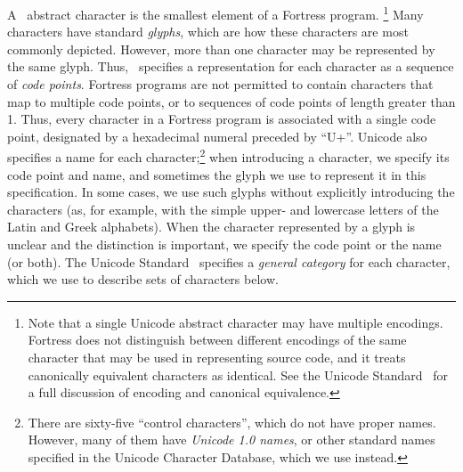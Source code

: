 A \unicode\ abstract character is the smallest element
of a Fortress program.
\footnote{Note that
a single Unicode abstract character may have multiple encodings.
Fortress does not distinguish between different encodings
of the same character that may be used in representing source code,
and it treats canonically equivalent characters as identical.
See the Unicode Standard~\cite{Unicode} for a full discussion
of encoding and canonical equivalence.}
Many characters have standard \emph{glyphs},
which are how these characters are most commonly depicted.
However,
more than one character may be represented by the same glyph.
Thus,
\unicode\ specifies a representation for each character
as a sequence of \emph{code points}.
Fortress programs are not permitted to contain characters
that map to multiple code points, or to sequences of code
points of length greater than 1.
Thus, every character in a Fortress program is associated with a
single code point,
designated by a hexadecimal numeral preceded by ``U+''.
Unicode also specifies a name for each character;\footnote{There are
sixty-five ``control characters'',
which do not have proper names.
However, many of them have \emph{Unicode 1.0 names},
or other standard names specified in the Unicode Character Database,
which we use instead.}
when introducing a character,
we specify its code point and name,
and sometimes the glyph we use to represent it in this specification.
In some cases,
we use such glyphs without explicitly introducing the characters
(as, for example, with the simple upper- and lowercase letters
of the Latin and Greek alphabets).
When the character represented by a glyph is unclear
and the distinction is important,
we specify the code point or the name (or both).
The Unicode Standard~\cite{Unicode} specifies
a \emph{general category} for each character,
which we use to describe sets of characters below.

